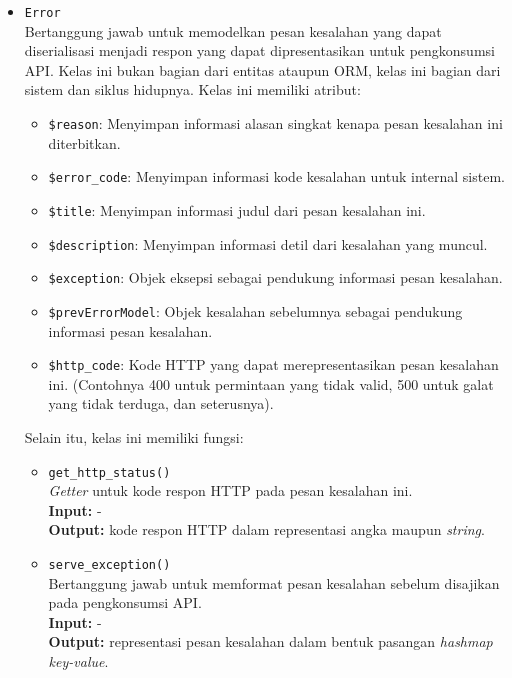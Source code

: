 \begin{itemize}
        \item \texttt{Error} \\
            Bertanggung jawab untuk memodelkan pesan kesalahan yang dapat
            diserialisasi menjadi respon yang dapat dipresentasikan untuk
            pengkonsumsi API. Kelas ini bukan bagian dari entitas ataupun ORM,
            kelas ini bagian dari sistem dan siklus hidupnya. Kelas ini memiliki
            atribut:
            \begin{itemize}
                \item \texttt{\$reason}: Menyimpan informasi alasan singkat
                    kenapa pesan kesalahan ini diterbitkan.
                \item \texttt{\$error\_code}: Menyimpan informasi kode kesalahan
                untuk internal sistem.
                \item \texttt{\$title}: Menyimpan informasi judul dari pesan
                kesalahan ini.
                \item \texttt{\$description}: Menyimpan informasi detil dari
                kesalahan yang muncul.
                \item \texttt{\$exception}: Objek eksepsi sebagai pendukung
                informasi pesan kesalahan.
                \item \texttt{\$prevErrorModel}: Objek kesalahan sebelumnya
                    sebagai pendukung informasi pesan kesalahan.
                \item \texttt{\$http\_code}: Kode HTTP yang dapat
                    merepresentasikan pesan kesalahan ini. (Contohnya 400 untuk
                    permintaan yang tidak valid, 500 untuk galat yang tidak
                    terduga, dan seterusnya).
            \end{itemize}
            Selain itu, kelas ini memiliki fungsi:
            \begin{itemize}
                \item \texttt{get\_http\_status()} \\
                    \textit{Getter} untuk kode respon HTTP pada pesan kesalahan
                    ini. \\
                    \textbf{Input:} - \\
                    \textbf{Output:} kode respon HTTP dalam representasi angka
                        maupun \textit{string}.
                    
                \item \texttt{serve\_exception()} \\
                    Bertanggung jawab untuk memformat pesan kesalahan sebelum
                    disajikan pada pengkonsumsi API. \\
                    \textbf{Input:} - \\
                    \textbf{Output:} representasi pesan kesalahan dalam bentuk
                        pasangan \textit{hashmap key-value}.
            \end{itemize}
                

\end{itemize}
